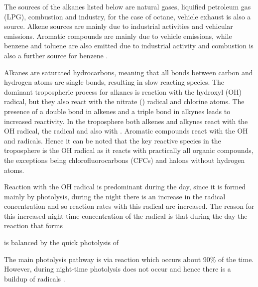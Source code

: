 The sources of the alkanes listed below are natural gases, liquified petroleum gas (LPG), combustion and industry, for the case
of octane, vehicle exhaust is also a source. Alkene sources are mainly due to industrial activities and vehicular emissions. 
Aromatic compounds are mainly due to vehicle emissions, while benzene and toluene are also emitted due to industrial activity 
and combustion is also a further source for benzene \citep{Arsene:2009}.

Alkanes are saturated hydrocarbons, meaning that all bonds between carbon and hydrogen atoms are single bonds, resulting in 
slow reacting species. The dominant tropospheric process for alkanes is reaction with the hydroxyl (OH) radical, but they also 
react with the nitrate () radical and chlorine atoms. The presence of a double bond in alkenes and a triple bond in 
alkynes leads to increased reactivity. In the troposphere both alkenes and alkynes react with the OH radical, the  
radical and also with . Aromatic compounds react with the OH and  radicals. Hence it can be noted that the key 
reactive species in the troposphere is the OH radical as it reacts with practically all organic compounds, the exceptions being
chlorofluorocarbons (CFCs) and halons without hydrogen atoms. 

Reaction with the OH radical is predominant during the day, since it is formed mainly by photolysis, during the night there is 
an increase in the  radical concentration and so reaction rates with this radical are increased. The reason for this 
increased night-time concentration of the  radical is that during the day the reaction that forms  
\begin{reactionlist}
\end{reactionlist}
is balanced by the quick photolysis of 
\begin{reactionlist}
\end{reactionlist}
The main photolysis pathway is via reaction  which occurs about 90\% of the time. However, during 
night-time photolysis does not occur and hence there is a buildup of  radicals \citep{Atkinson:1990, Atkinson:2000}.

